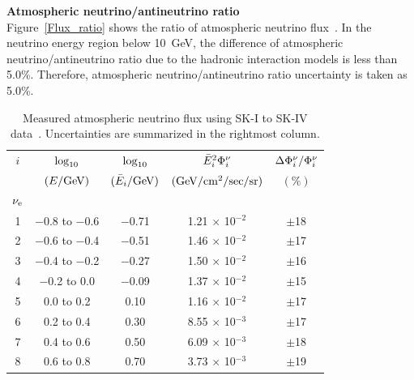 \textbf{Atmospheric neutrino/antineutrino ratio}\\
\hs
Figure~\ref{Flux_ratio} shows the ratio of atmospheric neutrino flux~\cite{2007Honda}.
In the neutrino energy region below 10~GeV, the difference of atmospheric neutrino/antineutrino ratio due to the hadronic interaction models is less than 5.0\%.
Therefore, atmospheric neutrino/antineutrino ratio uncertainty is taken as 5.0\%.\\

\begin{table}[p]
	\centering
	\caption[Measured atmospheric neutrino flux using SK-I to SK-IV data]{
	Measured atmospheric neutrino flux using SK-I to SK-IV data~\cite{2016Richard}.
	Uncertainties are summarized in the rightmost column.
	}\label{tab:Flux}
	\vs
	\begin{tabular}{ccccc} \hline \hline
		$i$ & ${\rm log}_{10}$ & ${\rm log}_{10}$ & $\bar{E}_{i}^{2}{\rm \Phi}_{i}^{\nu}$ & $\Delta{\rm \Phi}_{i}^{\nu}/{\rm \Phi}_{i}^{\nu}$ \\
		                & $(E/{\rm GeV})$  & $(\bar{E}_{i}/{\rm GeV})$ & $({\rm GeV}/{\rm cm}^{2}/{\rm sec}/{\rm sr})$ & $(\%)$  \\ \hline
		$\nu_{{\rm e}}$ &                  &                           &                                               &         \\
		1               & $-$0.8 to $-$0.6 & $-$0.71                   & 1.21 $\times$ 10$^{-\text{2}}$                & $\pm$18 \\
		2               & $-$0.6 to $-$0.4 & $-$0.51                   & 1.46 $\times$ 10$^{-\text{2}}$                & $\pm$17 \\
		3               & $-$0.4 to $-$0.2 & $-$0.27                   & 1.50 $\times$ 10$^{-\text{2}}$                & $\pm$16 \\
		4               & $-$0.2 to 0.0    & $-$0.09                   & 1.37 $\times$ 10$^{-\text{2}}$                & $\pm$15 \\
		5               & 0.0 to 0.2       & 0.10                      & 1.16 $\times$ 10$^{-\text{2}}$                & $\pm$17 \\
		6               & 0.2 to 0.4       & 0.30                      & 8.55 $\times$ 10$^{-\text{3}}$                & $\pm$17 \\
		7               & 0.4 to 0.6       & 0.50                      & 6.09 $\times$ 10$^{-\text{3}}$                & $\pm$18 \\
		8               & 0.6 to 0.8       & 0.70                      & 3.73 $\times$ 10$^{-\text{3}}$                & $\pm$19 \\

\end{tabular}
\end{table}
